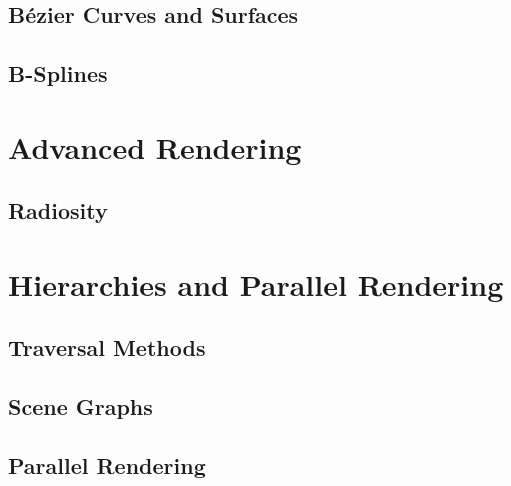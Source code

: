\documentclass[11pt,a4paper]{article}
\begin{document}
	\subsection{Bézier Curves and Surfaces}
	\subsection{B-Splines}
\section{Advanced Rendering}
	\subsection{Radiosity}
\section{Hierarchies and Parallel Rendering}
	 \subsection{Traversal Methods}
	 \subsection{Scene Graphs}
	 \subsection{Parallel Rendering}
\end{document}
